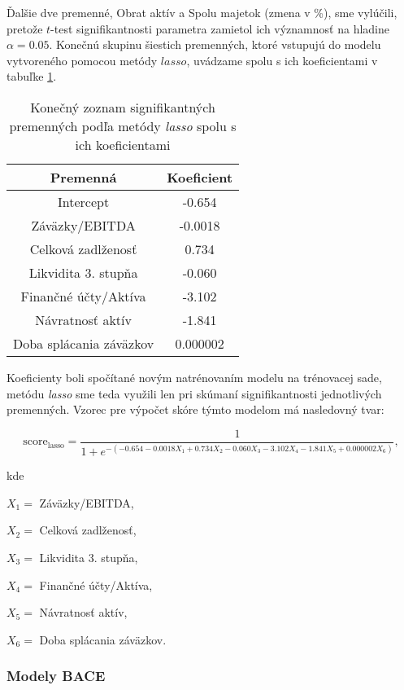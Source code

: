 Ďalšie dve premenné, Obrat aktív a Spolu majetok (zmena v \%), sme vylúčili, pretože \(t\)-test signifikantnosti parametra zamietol ich významnosť na hladine \(\alpha = 0.05\).
Konečnú skupinu šiestich premenných, ktoré vstupujú do modelu vytvoreného pomocou metódy \(lasso\), uvádzame spolu s ich koeficientami v tabuľke \ref{lasso tabulka konecne parametre}.

\begin{table}
    \begin{tabular}{ |c|c| }
        \hline
        Premenná & Koeficient \\
        \hline
        Intercept & -0.654 \\
        \hline
        Záväzky/EBITDA & -0.0018 \\
        \hline
        Celková zadlženosť & 0.734 \\
        \hline
        Likvidita 3. stupňa & -0.060 \\
        \hline
        Finančné účty/Aktíva & -3.102 \\
        \hline
        Návratnosť aktív & -1.841 \\
        \hline
        Doba splácania záväzkov & 0.000002 \\
        \hline
    \end{tabular}
    \caption{Konečný zoznam signifikantných premenných podľa metódy \emph{lasso} spolu s ich koeficientami}
    \label{lasso tabulka konecne parametre}
\end{table}

Koeficienty boli spočítané novým natrénovaním modelu na trénovacej sade,
metódu \emph{lasso} sme teda využili len pri skúmaní signifikantnosti jednotlivých premenných.
Vzorec pre výpočet skóre týmto modelom má nasledovný tvar:

\[
    \text{score}_\text{lasso} = \frac{1}{1 + e^{-(-0.654 - 0.0018X_1 + 0.734X_2 - 0.060X_3 - 3.102X_4 - 1.841X_5 + 0.000002X_6)}},
\]

kde

\(X_1 = \) Záväzky/EBITDA,

\(X_2 = \) Celková zadlženosť,

\(X_3 = \) Likvidita 3. stupňa,

\(X_4 = \) Finančné účty/Aktíva,

\(X_5 = \) Návratnosť aktív,

\(X_6 = \) Doba splácania záväzkov.

\subsubsection{Modely BACE}
\label{modely bace}

